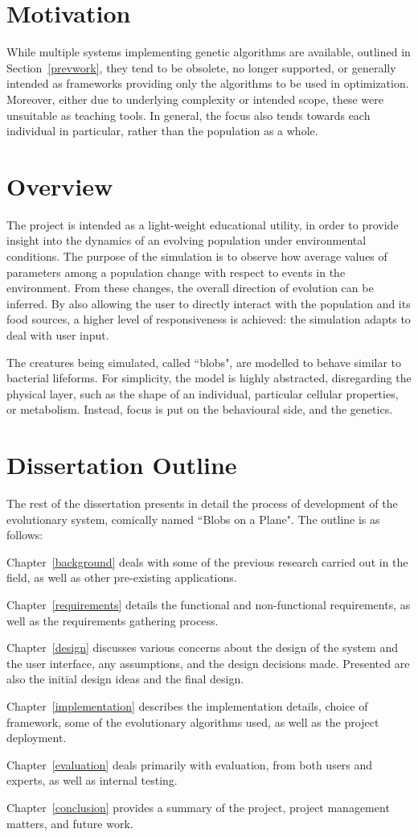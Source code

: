 \section{Motivation}
While multiple systems implementing genetic algorithms are available, outlined in Section~\ref{prevwork}, they tend to be obsolete, no longer supported, or generally intended as frameworks providing only the algorithms to be used in optimization. Moreover, either due to underlying complexity or intended scope, these were unsuitable as teaching tools. In general, the focus also tends towards each individual in particular, rather than the population as a whole.

\section{Overview}
The project is intended as a light-weight educational utility, in order to provide insight into the dynamics of an evolving population under environmental conditions. The purpose of the simulation is to observe how average values of parameters among a population change with respect to events in the environment. From these changes, the overall direction of evolution can be inferred. By also allowing the user to directly interact with the population and its food sources, a higher level of responsiveness is achieved: the simulation adapts to deal with user input.

The creatures being simulated, called ``blobs", are modelled to behave similar to bacterial lifeforms. For simplicity, the model is highly abstracted, disregarding the physical layer, such as the shape of an individual, particular cellular properties, or metabolism. Instead, focus is put on the behavioural side, and the genetics.

\section{Dissertation Outline}
The rest of the dissertation presents in detail the process of development of the evolutionary system, comically named ``Blobs on a Plane". The outline is as follows:

Chapter~\ref{background} deals with some of the previous research carried out in the field, as well as other pre-existing applications.

Chapter~\ref{requirements} details the functional and non-functional requirements, as well as the requirements gathering process.

Chapter~\ref{design} discusses various concerns about the design of the system and the user interface, any assumptions, and the design decisions made. Presented are also the initial design ideas and the final design.

Chapter~\ref{implementation} describes the implementation details, choice of framework, some of the evolutionary algorithms used, as well as the project deployment.

Chapter~\ref{evaluation} deals primarily with evaluation, from both users and experts, as well as internal testing.

Chapter~\ref{conclusion} provides a summary of the project, project management matters, and future work.